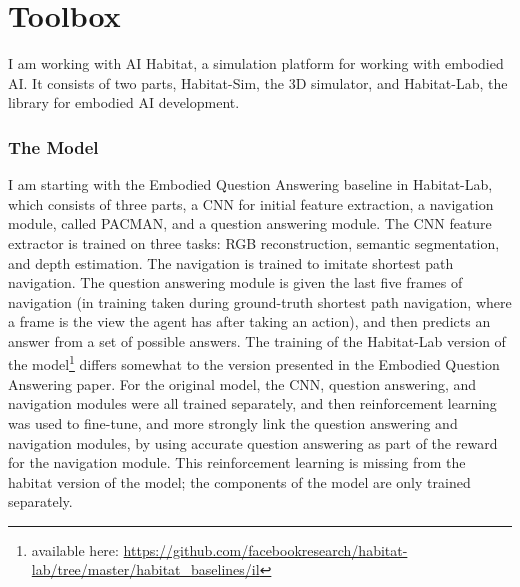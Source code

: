 \chapter{Toolbox}
I am working with AI Habitat, a simulation platform for working with embodied AI\cite{habitat19iccv}. It consists of two parts, Habitat-Sim, the 3D simulator, and Habitat-Lab, the library for embodied AI development. 

\subsection{The Model}
\label{subsection:model}
I am starting with the Embodied Question Answering baseline in Habitat-Lab, which consists of three parts, a CNN for initial feature extraction, a navigation module, called PACMAN, and a question answering module\cite{embodiedqa}.
The CNN feature extractor is trained on three tasks: RGB reconstruction, semantic segmentation, and depth estimation.
The navigation is trained to imitate shortest path navigation. %
The question answering module is given the last five frames of navigation (in training taken during ground-truth shortest path navigation, where a frame is the view the agent has after taking an action), and then predicts an answer from a set of possible answers. 
The training of the Habitat-Lab version of the model\footnote{available here: \url{https://github.com/facebookresearch/habitat-lab/tree/master/habitat_baselines/il}} differs somewhat to the version presented in the Embodied Question Answering paper\cite{embodiedqa}. For the original model, the CNN, question answering, and navigation modules were all trained separately, and then reinforcement learning was used to fine-tune, and more strongly link the question answering and navigation modules, by using accurate question answering %
as part of the reward for the navigation module. This reinforcement learning is missing from the habitat version of the model; the components of the model are only trained separately. 




